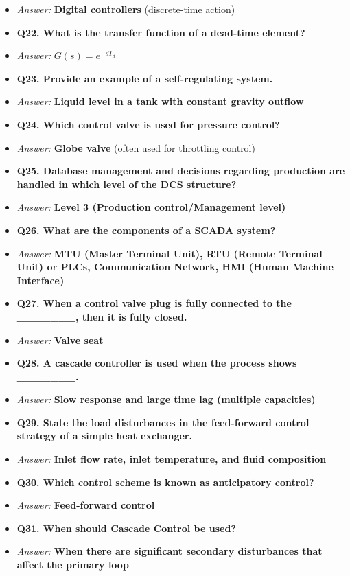 \begin{itemize}
  \item \textit{Answer:} \textbf{Digital controllers} (discrete-time action)
  \item \textbf{Q22. What is the transfer function of a dead-time element?}
  \item \textit{Answer:} \textbf{$G(s) = e^{-s T_d}$}
  \item \textbf{Q23. Provide an example of a self-regulating system.}
  \item \textit{Answer:} \textbf{Liquid level in a tank with constant gravity outflow}
  \item \textbf{Q24. Which control valve is used for pressure control?}
  \item \textit{Answer:} \textbf{Globe valve} (often used for throttling control)
  \item \textbf{Q25. Database management and decisions regarding production are handled in which level of the DCS structure?}
  \item \textit{Answer:} \textbf{Level 3 (Production control/Management level)}
  \item \textbf{Q26. What are the components of a SCADA system?}
  \item \textit{Answer:} \textbf{MTU (Master Terminal Unit), RTU (Remote Terminal Unit) or PLCs, Communication Network, HMI (Human Machine Interface)}
  \item \textbf{Q27. When a control valve plug is fully connected to the \_\_\_\_\_\_\_, then it is fully closed.}
  \item \textit{Answer:} \textbf{Valve seat}
  \item \textbf{Q28. A cascade controller is used when the process shows \_\_\_\_\_\_\_.}
  \item \textit{Answer:} \textbf{Slow response and large time lag (multiple capacities)}
  \item \textbf{Q29. State the load disturbances in the feed-forward control strategy of a simple heat exchanger.}
  \item \textit{Answer:} \textbf{Inlet flow rate, inlet temperature, and fluid composition}
  \item \textbf{Q30. Which control scheme is known as anticipatory control?}
  \item \textit{Answer:} \textbf{Feed-forward control}
  \item \textbf{Q31. When should Cascade Control be used?}
  \item \textit{Answer:} \textbf{When there are significant secondary disturbances that affect the primary loop}

\end{itemize}
